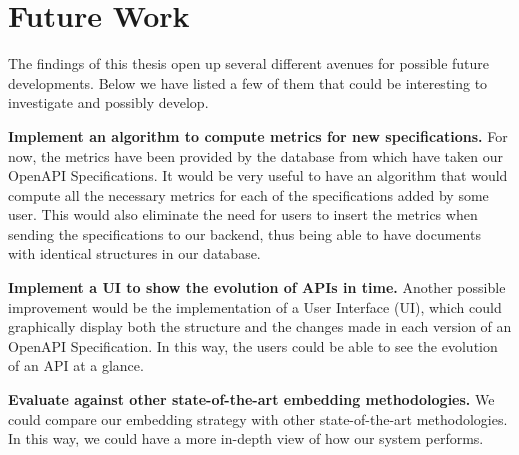 \section{Future Work}\label{sec:future-work}
The findings of this thesis open up several different avenues for possible future developments.
Below we have listed a few of them that could be interesting to investigate and possibly develop.

\begin{description}
    \item \textbf{Implement an algorithm to compute metrics for new specifications.} For now, the metrics have been provided by the database from which have taken our OpenAPI Specifications.
    It would be very useful to have an algorithm that would compute all the necessary metrics for each of the specifications added by some user.
    This would also eliminate the need for users to insert the metrics when sending the specifications to our backend, thus being able to have documents with identical structures in our database.
    \item \textbf{Implement a UI to show the evolution of APIs in time.} Another possible improvement would be the implementation of a User Interface (UI), which could graphically display both the structure and the changes made in each version of an OpenAPI Specification.
    In this way, the users could be able to see the evolution of an API at a glance.
    \item \textbf{Evaluate against other state-of-the-art embedding methodologies.} We could compare our embedding strategy with other state-of-the-art methodologies.
    In this way, we could have a more in-depth view of how our system performs.
\end{description}
